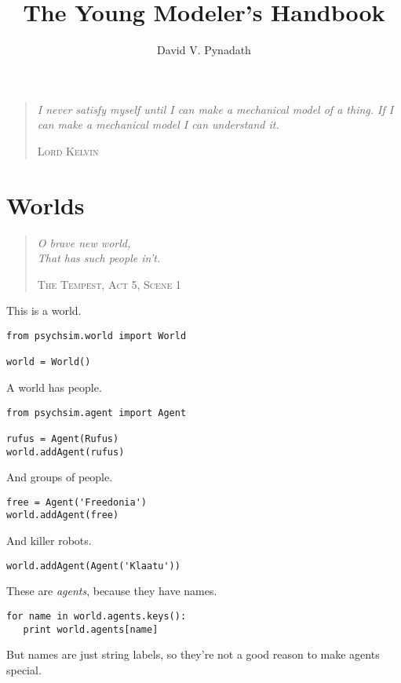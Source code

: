 \documentclass{article}
\title{The Young Modeler's Handbook}
\author{David V. Pynadath}
\begin{document}
\maketitle
\begin{quotation}
\noindent
\textit{I never satisfy myself until I can make a mechanical model of a thing. If I can make a mechanical model I can understand it.}

\hfill \textsc{Lord Kelvin}
\end{quotation}
\clearpage
\section{Worlds}
\begin{quotation}
\noindent\textit{O brave new world,\\
That has such people in't.}

\hfill\textsc{The Tempest, Act 5, Scene 1}
\end{quotation}

This is a world.

\begin{verbatim}
from psychsim.world import World

world = World()
\end{verbatim}

A world has people.

\begin{verbatim}
from psychsim.agent import Agent

rufus = Agent(Rufus)
world.addAgent(rufus)
\end{verbatim}

And groups of people.

\begin{verbatim}
free = Agent('Freedonia')
world.addAgent(free)
\end{verbatim}

And killer robots.

\begin{verbatim}
world.addAgent(Agent('Klaatu'))
\end{verbatim}

These are \textit{agents}, because they have names.

\begin{verbatim}
for name in world.agents.keys():
   print world.agents[name]
\end{verbatim}

But names are just string labels, so they're not a good reason to make agents special.
\end{document}

